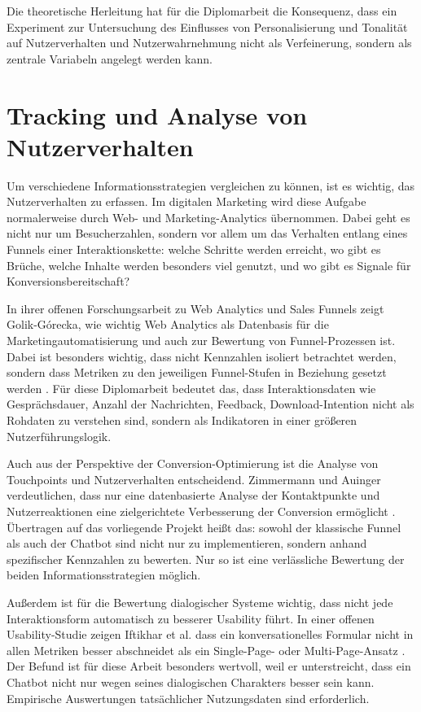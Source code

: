 Die theoretische Herleitung hat für die Diplomarbeit die Konsequenz, dass ein 
Experiment zur Untersuchung des Einflusses von Personalisierung und Tonalität auf 
Nutzerverhalten und Nutzerwahrnehmung nicht als Verfeinerung, sondern als 
zentrale Variabeln angelegt werden kann.


\section{Tracking und Analyse von Nutzerverhalten}

Um verschiedene Informationsstrategien vergleichen zu können, ist es wichtig, 
das Nutzerverhalten zu erfassen. Im digitalen Marketing wird diese Aufgabe 
normalerweise durch Web- und Marketing-Analytics übernommen. Dabei geht es nicht 
nur um Besucherzahlen, sondern vor allem um das Verhalten entlang eines Funnels 
einer Interaktionskette: welche Schritte werden erreicht, wo gibt es Brüche, 
welche Inhalte werden besonders viel genutzt, und wo gibt es Signale für 
Konversionsbereitschaft?

In ihrer offenen Forschungsarbeit zu Web Analytics und Sales Funnels zeigt 
Golik-Górecka, wie wichtig Web Analytics als Datenbasis für die 
Marketingautomatisierung und auch zur Bewertung von Funnel-Prozessen ist. 
Dabei ist besonders wichtig, dass nicht Kennzahlen isoliert betrachtet werden, 
sondern dass Metriken zu den jeweiligen Funnel-Stufen in Beziehung gesetzt werden \cite{GolikGorecka2023}.
Für diese Diplomarbeit bedeutet das, dass Interaktionsdaten wie Gesprächsdauer, 
Anzahl der Nachrichten, Feedback, Download-Intention nicht als Rohdaten zu 
verstehen sind, sondern als Indikatoren in einer größeren Nutzerführungslogik.

Auch aus der Perspektive der Conversion-Optimierung ist die
Analyse von Touchpoints und Nutzerverhalten entscheidend. Zimmermann
und Auinger verdeutlichen, dass nur eine datenbasierte Analyse der
Kontaktpunkte und Nutzerreaktionen eine zielgerichtete Verbesserung der
Conversion ermöglicht \cite{Zimmermann2023}.
Übertragen auf das vorliegende Projekt heißt das: sowohl der klassische
Funnel als auch der Chatbot sind nicht nur zu implementieren, sondern
anhand spezifischer Kennzahlen zu bewerten. Nur so ist eine
verlässliche Bewertung der beiden Informationsstrategien möglich.

Außerdem ist für die Bewertung dialogischer Systeme wichtig, dass nicht jede 
Interaktionsform automatisch zu besserer Usability führt. In einer offenen 
Usability-Studie zeigen Iftikhar et al. dass ein konversationelles Formular nicht 
in allen Metriken besser abschneidet als ein Single-Page- oder Multi-Page-Ansatz 
\cite{Iftikhar2021}. 
Der Befund ist für diese Arbeit besonders wertvoll, weil er unterstreicht, dass 
ein Chatbot nicht nur wegen seines dialogischen Charakters besser sein kann. 
Empirische Auswertungen tatsächlicher Nutzungsdaten sind erforderlich.

